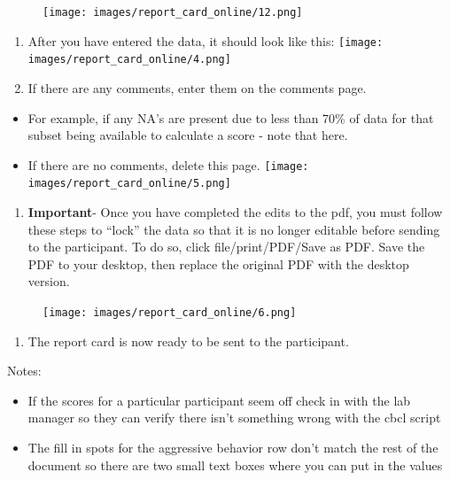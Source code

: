 \documentclass[
]{book}
\providecommand{\tightlist}{%
  \setlength{\itemsep}{0pt}\setlength{\parskip}{0pt}}
\begin{document}
\begin{figure}
\centering
\texttt{[image: images/report\_card\_online/12.png]}
\caption{}
\end{figure}

\begin{enumerate}
\def\labelenumi{\arabic{enumi}.}
\setcounter{enumi}{4}
\item
  After you have entered the data, it should look like this:
  \texttt{[image: images/report\_card\_online/4.png]}
\item
  If there are any comments, enter them on the comments page.
\end{enumerate}

\begin{itemize}
\tightlist
\item
  For example, if any NA's are present due to less than 70\% of data for that subset being available to calculate a score - note that here.
\item
  If there are no comments, delete this page.
  \texttt{[image: images/report\_card\_online/5.png]}
\end{itemize}

\begin{enumerate}
\def\labelenumi{\arabic{enumi}.}
\setcounter{enumi}{6}
\tightlist
\item
  \textbf{Important}- Once you have completed the edits to the pdf, you must follow these steps to ``lock'' the data so that it is no longer editable before sending to the participant. To do so, click file/print/PDF/Save as PDF. Save the PDF to your desktop, then replace the original PDF with the desktop version.
\end{enumerate}

\begin{figure}
\centering
\texttt{[image: images/report\_card\_online/6.png]}
\caption{}
\end{figure}

\begin{enumerate}
\def\labelenumi{\arabic{enumi}.}
\setcounter{enumi}{7}
\tightlist
\item
  The report card is now ready to be sent to the participant.
\end{enumerate}

Notes:

\begin{itemize}
\item
  If the scores for a particular participant seem off check in with the lab manager so they can verify there isn't something wrong with the cbcl script
\item
  The fill in spots for the aggressive behavior row don't match the rest of the document so there are two small text boxes where you can put in the values
\end{itemize}
\end{document}
